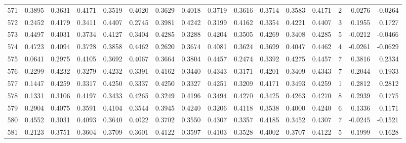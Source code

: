 \begin{tabular}{lrrrrrrrrrrrrrrr}
571 &      0.3895 &  0.3631 &  0.4171 &  0.3519 &  0.4020 &  0.3629 &  0.4018 &  0.3719 &  0.3616 &  0.3714 &   0.3583 &     0.4171 &      2 &                    0.0276 &                    -0.0264 \\
572 &      0.2452 &  0.4179 &  0.3411 &  0.4407 &  0.2745 &  0.3981 &  0.4242 &  0.3199 &  0.4162 &  0.3354 &   0.4221 &     0.4407 &      3 &                    0.1955 &                     0.1727 \\
573 &      0.4497 &  0.4031 &  0.3734 &  0.4127 &  0.3404 &  0.4285 &  0.3288 &  0.4204 &  0.3505 &  0.4269 &   0.3408 &     0.4285 &      5 &                   -0.0212 &                    -0.0466 \\
574 &      0.4723 &  0.4094 &  0.3728 &  0.3858 &  0.4462 &  0.2620 &  0.3674 &  0.4081 &  0.3624 &  0.3699 &   0.4047 &     0.4462 &      4 &                   -0.0261 &                    -0.0629 \\
575 &      0.0641 &  0.2975 &  0.4105 &  0.3692 &  0.4067 &  0.3664 &  0.3804 &  0.4457 &  0.2474 &  0.3392 &   0.4275 &     0.4457 &      7 &                    0.3816 &                     0.2334 \\
576 &      0.2299 &  0.4232 &  0.3279 &  0.4232 &  0.3391 &  0.4162 &  0.3440 &  0.4343 &  0.3171 &  0.4201 &   0.3409 &     0.4343 &      7 &                    0.2044 &                     0.1933 \\
577 &      0.1447 &  0.4259 &  0.3317 &  0.4250 &  0.3337 &  0.4250 &  0.3327 &  0.4251 &  0.3209 &  0.4171 &   0.3493 &     0.4259 &      1 &                    0.2812 &                     0.2812 \\
578 &      0.1331 &  0.3106 &  0.4197 &  0.3433 &  0.4265 &  0.3249 &  0.4196 &  0.3494 &  0.4270 &  0.3425 &   0.4263 &     0.4270 &      8 &                    0.2939 &                     0.1775 \\
579 &      0.2904 &  0.4075 &  0.3591 &  0.4104 &  0.3544 &  0.3945 &  0.4240 &  0.3206 &  0.4118 &  0.3538 &   0.4000 &     0.4240 &      6 &                    0.1336 &                     0.1171 \\
580 &      0.4552 &  0.3031 &  0.4093 &  0.3640 &  0.4022 &  0.3702 &  0.3550 &  0.4307 &  0.3357 &  0.4185 &   0.3452 &     0.4307 &      7 &                   -0.0245 &                    -0.1521 \\
581 &      0.2123 &  0.3751 &  0.3604 &  0.3709 &  0.3601 &  0.4122 &  0.3597 &  0.4103 &  0.3528 &  0.4002 &   0.3707 &     0.4122 &      5 &                    0.1999 &                     0.1628 \\

\end{tabular}
